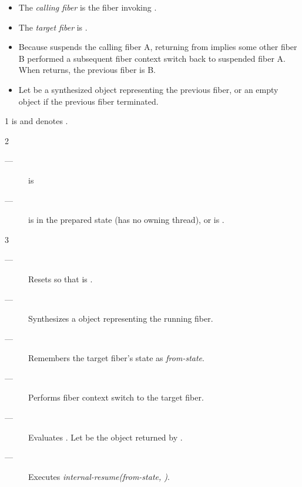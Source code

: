 \begin{itemize}
    \item The \emph{calling fiber} is the fiber invoking \resumewith.
    \item The \emph{target fiber} is \thefiber{\state}.
    \item Because \resumewith suspends the calling fiber A, returning
          from \resumewith implies some other fiber B performed a
          subsequent fiber context switch back to suspended fiber A.
          When \resumewith returns, the previous fiber is B.
    \item Let  be a synthesized \fiber object representing the
          previous fiber, or an empty \fiber object if the previous fiber
          terminated.
\end{itemize}

1 \mandates
{} is \true
and  denotes \fiber\cpp{\&\&}.

2 \precond

\begin{description}
    \item[---]  is \false
    \item[---] \thisfiber is in the prepared state (has no owning thread),
               or \currthread is \ownthread.
\end{description}

3 \effects
\begin{description}
    \item[---] Resets \state so that  is \true.
    \item[---] Synthesizes a \fiber object  representing the running fiber.
    \item[---] Remembers the target fiber's state as \emph{from-state}.
    \item[---] Performs fiber context switch to the target fiber.
    \item[---] Evaluates .
               Let  be the \fiber object returned by .
    \item[---] Executes \emph{internal-resume(from-state, )}.
\end{description}

